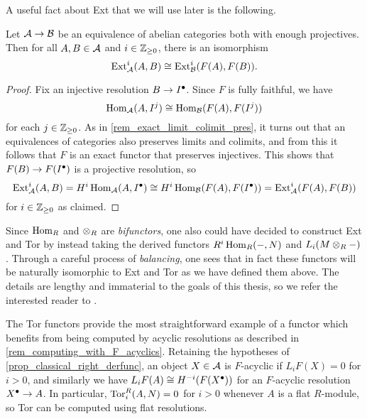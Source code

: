 A useful fact about Ext that we will use later is the following.

\begin{lemma}
  \label{lemma_ext_preserved_by_equiv}
  Let $\abcat{A} \to \abcat{B}$ be an equivalence of abelian
  categories both with enough projectives.
  Then for all $A, B \in \abcat{A}$ and $i \in \zpos$, there is an isomorphism
  \[
    \Ext{i}{\abcat{A}}(A, B) \cong \Ext{i}{\abcat{B}}(F(A), F(B)).
  \]
  \vspace{-24pt}
\end{lemma}

\begin{proof}
  Fix an injective resolution $B \to \cochaincomp{I}$.
  Since $F$ is fully faithful, we have
  \[
    \Hom_{\abcat{A}}(A, I^j) \cong \Hom_{\abcat{B}}(F(A), F(I^j))
  \]
  for each $j \in \zpos$.
  As in \cref{rem_exact_limit_colimit_pres}, it turns out that an
  equivalences of categories also preserves limits and colimits, and
  from this it follows that $F$ is an exact functor that preserves injectives.
  This shows that $F(B) \to F(\cochaincomp{I})$ is a projective resolution, so
  \[
    \Ext{i}{\abcat{A}}(A, B)
    = H^i \Hom_{\abcat{A}}(A, \cochaincomp{I})
    \cong H^i \Hom_{\abcat{B}}(F(A), F(\cochaincomp{I}))
    = \Ext{i}{\abcat{A}}(F(A), F(B))
  \]
  for $i \in \zpos$ as claimed.
\end{proof}

\begin{remark}
  Since $\Hom_R$ and $\tensor_R$ are \emph{bifunctors}, one also
  could have decided to construct Ext and Tor by instead taking the
  derived functors $R^i \Hom_R(-, N)$ and $L_i (M \tensor_R -)$.
  Through a careful process of \emph{balancing}, one sees that in
  fact these functors will be naturally isomorphic to Ext and Tor as
  we have defined them above.
  The details are lengthy and immaterial to the goals of this thesis,
  so we refer the interested reader to \cite[Section~2.7]{weibel}.
\end{remark}

\begin{remark}
  \label{rem_tor_computed_by_flat_res}
  The Tor functors provide the most straightforward example of a
  functor which benefits from being computed by acyclic resolutions
  as described in \cref{rem_computing_with_F_acyclics}.
  Retaining the hypotheses of \cref{prop_classical_right_derfunc}, an
  object $X \in \abcat{A}$ is $F$-acyclic if $L_iF(X) = 0$ for $i >
  0$, and similarly we have $L_iF(A) \cong
  H^{-i}(F(\cochaincomp{X}))$ for an $F$-acyclic resolution
  $\cochaincomp{X} \to A$.
  In particular, $\Tor{i}{R}(A, N) = 0$ for $i > 0$ whenever $A$ is a
  flat $R$-module, so Tor can be computed using flat resolutions.
\end{remark}
